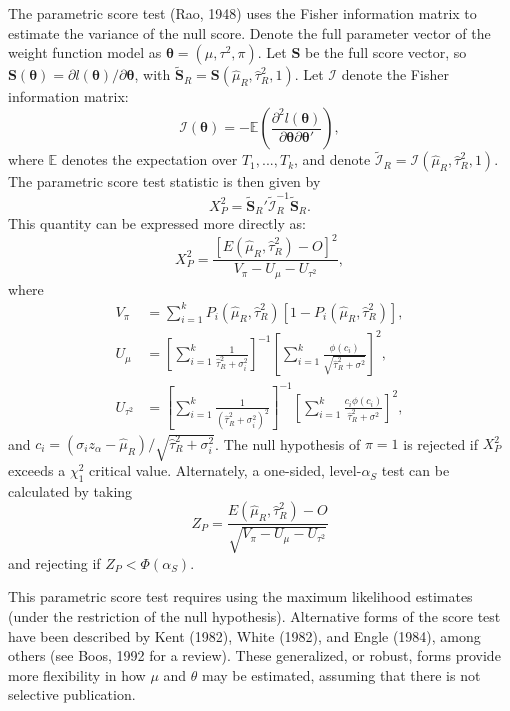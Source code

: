 \documentclass[man,floatsintext]{apa6}
\begin{document}
The parametric score test (Rao, 1948) uses the Fisher information matrix to estimate the variance of the null score. Denote the full parameter vector of the weight function model as \(\boldsymbol\theta = (\mu, \tau^2, \pi)\). Let \(\bm{S}\) be the full score vector, so \(\bm{S}(\boldsymbol\theta) = \partial l(\boldsymbol\theta) / \partial \boldsymbol\theta\), with \(\bm{\tilde{S}}_R = \bm{S}(\hat\mu_R, \hat\tau^2_R, 1)\). Let \(\mathcal{I}\) denote the Fisher information matrix:
\[
\mathcal{I}(\boldsymbol\theta) = - \mathbb{E}\left(\frac{\partial^2 l(\boldsymbol\theta)}{\partial \boldsymbol\theta \partial \boldsymbol\theta'} \right),
\]
where \(\mathbb{E}\) denotes the expectation over \(T_1,...,T_k\), and denote \(\tilde{\mathcal{I}}_R = \mathcal{I}(\hat\mu_R, \hat\tau^2_R, 1)\). The parametric score test statistic is then given by
\[
X^2_P = \bm{\tilde{S}}_R'\tilde{\mathcal{I}}_R^{-1} \bm{\tilde{S}}_R.
\]
This quantity can be expressed more directly as:
\begin{equation}
X^2_P = \frac{\left[E(\hat\mu_R, \hat\tau^2_R) - O\right]^2}{V_\pi - U_\mu - U_{\tau^2}},
\label{eq:parametric-score}
\end{equation}
where
\[
\begin{aligned}
V_\pi &= \sum_{i=1}^k P_i(\hat\mu_R, \hat\tau^2_R) \left[1 - P_i(\hat\mu_R, \hat\tau^2_R)\right], \\
U_\mu &= \left[\sum_{i=1}^k \frac{1}{\hat\tau_R^2 + \sigma_i^2}\right]^{-1}\left[\sum_{i=1}^k \frac{\phi(c_i)}{\sqrt{\hat\tau^2_R + \sigma^2}}\right]^2, \\
U_{\tau^2} &= \left[\sum_{i=1}^k \frac{1}{\left(\hat\tau_R^2 + \sigma_i^2\right)^2}\right]^{-1}\left[\sum_{i=1}^k \frac{c_i\phi(c_i)}{\hat\tau^2_R + \sigma^2}\right]^2,
\end{aligned}
\]
and \(c_i = \left(\sigma_i z_\alpha - \hat\mu_R\right) / \sqrt{\hat\tau^2_R + \sigma_i^2}\).
The null hypothesis of \(\pi = 1\) is rejected if \(X^2_P\) exceeds a \(\chi^2_1\) critical value.
Alternately, a one-sided, level-\(\alpha_S\) test can be calculated by taking
\begin{equation}
Z_P = \frac{E(\hat\mu_R, \hat\tau^2_R) - O}{\sqrt{V_\pi - U_\mu - U_{\tau^2}}}
\end{equation}
and rejecting if \(Z_P < \Phi(\alpha_S)\).

This parametric score test requires using the maximum likelihood estimates (under the restriction of the null hypothesis). Alternative forms of the score test have been described by Kent (1982), White (1982), and Engle (1984), among others (see Boos, 1992 for a review).
These generalized, or robust, forms provide more flexibility in how \(\mu\) and \(\theta\) may be estimated, assuming that there is not selective publication.
\end{document}
